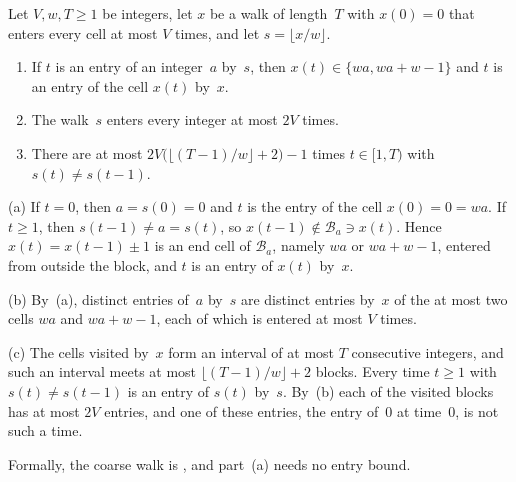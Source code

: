\begin{lemma}\label{lem:skel-coarse}
Let $V,w,T\ge1$ be integers, let $x$ be a walk of length~$T$ with $x(0)=0$ that enters every cell at most $V$ times, and
let $s=\lfloor x/w\rfloor$.
\begin{enumerate}[label=(\alph*)]
\item If $t$ is an entry of an integer~$a$ by~$s$, then $x(t)\in\{wa,wa+w-1\}$ and $t$ is an entry of the cell $x(t)$
by~$x$.
\item The walk~$s$ enters every integer at most $2V$ times.
\item There are at most $2V\bigl(\lfloor(T-1)/w\rfloor+2\bigr)-1$ times $t\in[1,T)$ with $s(t)\ne s(t-1)$.
\end{enumerate}
\end{lemma}

\begin{outline}
(a) If $t=0$, then $a=s(0)=0$ and $t$ is the entry of the cell $x(0)=0=wa$. If $t\ge1$, then $s(t-1)\ne a=s(t)$, so
$x(t-1)\notin\mathcal B_a\ni x(t)$. Hence $x(t)=x(t-1)\pm1$ is an end cell of $\mathcal B_a$, namely $wa$ or $wa+w-1$,
entered from outside the block, and $t$ is an entry of $x(t)$ by~$x$.

(b) By~(a), distinct entries of~$a$ by~$s$ are distinct entries by~$x$ of the at most two cells $wa$ and $wa+w-1$, each
of which is entered at most $V$ times.

(c) The cells visited by~$x$ form an interval of at most $T$ consecutive integers, and such an interval meets at most
$\lfloor(T-1)/w\rfloor+2$ blocks. Every time $t\ge1$ with $s(t)\ne s(t-1)$ is an entry of $s(t)$ by~$s$. By~(b) each of
the visited blocks has at most $2V$ entries, and one of these entries, the entry of~$0$ at time~$0$, is not such a time.

Formally, the coarse walk is , and part~(a) needs no entry bound.
\end{outline}

